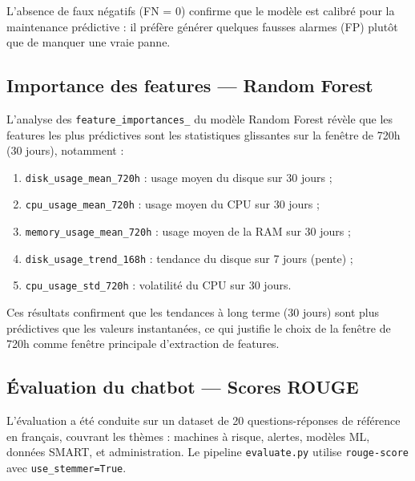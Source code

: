 L'absence de faux négatifs (FN = 0) confirme que le modèle est calibré pour la
maintenance prédictive : il préfère générer quelques fausses alarmes (FP) plutôt que
de manquer une vraie panne.

\subsection{Importance des features — Random Forest}

L'analyse des \texttt{feature\_importances\_} du modèle Random Forest révèle que les
features les plus prédictives sont les statistiques glissantes sur la fenêtre de 720h
(30 jours), notamment :

\begin{enumerate}
  \item \texttt{disk\_usage\_mean\_720h} : usage moyen du disque sur 30 jours ;
  \item \texttt{cpu\_usage\_mean\_720h} : usage moyen du CPU sur 30 jours ;
  \item \texttt{memory\_usage\_mean\_720h} : usage moyen de la RAM sur 30 jours ;
  \item \texttt{disk\_usage\_trend\_168h} : tendance du disque sur 7 jours (pente) ;
  \item \texttt{cpu\_usage\_std\_720h} : volatilité du CPU sur 30 jours.
\end{enumerate}

Ces résultats confirment que les tendances à long terme (30 jours) sont plus prédictives
que les valeurs instantanées, ce qui justifie le choix de la fenêtre de 720h comme
fenêtre principale d'extraction de features.

\subsection{Évaluation du chatbot — Scores ROUGE}

L'évaluation a été conduite sur un dataset de 20 questions-réponses de référence en
français, couvrant les thèmes : machines à risque, alertes, modèles ML, données SMART,
et administration. Le pipeline \texttt{evaluate.py} utilise \texttt{rouge-score} avec
\texttt{use\_stemmer=True}.

